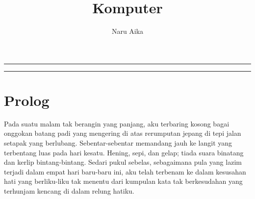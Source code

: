 \documentclass[smalldemyvopaper,11pt,twoside,onecolumn,openright,extrafontsizes]{memoir}
\title{Komputer}
\author{Naru Aika}
\newcommand{\ISBN}{0-000-00000-2}
\newcommand{\press}{}
\newcommand*\halftitlepage{\begingroup %
  \setlength\drop{0.1\textheight}
  \begin{center}
  \vspace*{\drop}
  \rule{\textwidth}{0in}\par
  {\Large\textsc\thetitle\par}
  \rule{\textwidth}{0in}\par
  \vfill
  \end{center}
\endgroup}
\newlength\drop{}
\newcommand*\titleM{\begingroup %
  \setlength\drop{0.15\textheight}
  \begin{center}
  \vspace*{\drop}
  \rule{\textwidth}{0in}\par
  {\HUGE\textsc\thetitle\par}
  \rule{\textwidth}{0in}\par
  {\Large\textit\theauthor\par}
  \vfill
  {\Large\scshape\press}
  \end{center}
\endgroup}
\begin{document}
\pagestyle{empty}
\titleM{}
\clearpage


\frontmatter{}
\pagestyle{mystyle}

\mainmatter{}

\chapter*{Prolog}


Pada suatu malam tak berangin yang panjang, aku terbaring kosong bagai onggokan batang padi yang mengering di atas rerumputan jepang di tepi jalan setapak yang berlubang. Sebentar-sebentar memandang jauh ke langit yang terbentang luas pada hari kesatu. Hening, sepi, dan gelap; tiada suara binatang dan kerlip bintang-bintang. Sedari pukul sebelas, sebagaimana pula yang lazim terjadi dalam empat hari baru-baru ini, aku telah terbenam ke dalam kesusahan hati yang berliku-liku tak menentu dari kumpulan kata tak berkesudahan yang terhunjam kencang di dalam relung hatiku.
\end{document}
